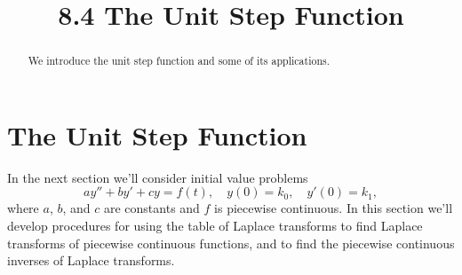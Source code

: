 \documentclass{ximera}
\title{8.4 The Unit Step Function}%
\begin{document}
\begin{abstract}
We introduce the unit step function and some of its applications.
\end{abstract}

\maketitle

\section*{The Unit Step Function}

In the next section we'll consider initial value problems
$$
ay''+by'+cy=f(t),\quad y(0)=k_0,\quad y'(0)=k_1,
$$
where $a$, $b$, and $c$ are constants and $f$ is piecewise continuous.
 In this section we'll develop procedures for using the
table of Laplace transforms to find  Laplace transforms of
piecewise continuous functions, and to find the piecewise continuous
inverses of Laplace transforms.
\end{document}
